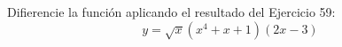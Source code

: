 \item Difierencie la función aplicando el resultado del Ejercicio 59:
$$y = \sqrt{x}(x^4 + x + 1)(2x - 3)$$
